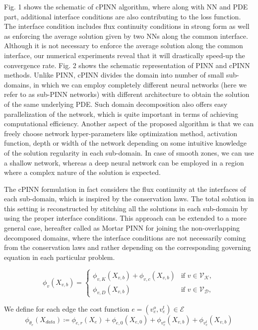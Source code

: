 Fig. 1 shows the schematic of cPINN algorithm, where along with NN and PDE part, additional interface conditions are also contributing to the loss function. The interface condition includes flux continuity conditions in strong form as well as enforcing the average solution given by two NNs along the common interface. Although it is not necessary to enforce the average solution along the common interface, our numerical experiments reveal that it will drastically speed-up the convergence rate. Fig. 2 shows the schematic representation of PINN and cPINN methods. Unlike PINN, cPINN divides the domain into number of small sub-domains, in which we can employ completely different neural networks (here we refer to as sub-PINN networks) with different architecture to obtain the solution of the same underlying PDE. Such domain decomposition also offers easy parallelization of the network, which is quite important in terms of achieving computational efficiency. Another aspect of the proposed algorithm is that we can freely choose network hyper-parameters like optimization method, activation function, depth or width of the network depending on some intuitive knowledge of the solution regularity in each sub-domain. In case of smooth zones, we can use a shallow network, whereas a deep neural network can be employed in a region where a complex nature of the solution is expected.

The cPINN formulation in fact considers the flux continuity at the interfaces of each sub-domain, which is inspired by the conservation laws. The total solution in this setting is reconstructed by stitching all the solutions in each sub-domain by using the proper interface conditions. This approach can be extended to a more general case, hereafter called as Mortar PINN for joining the non-overlapping decomposed domains, where the interface conditions are not necessarily coming from the conservation laws and rather depending on the corresponding governing equation in each particular problem.

\begin{equation}
    \label{vertex funcions}
    \phi_{v}(X_{v,b}) = \begin{cases} \phi_{v,K}  \left( X_{v,b} \right) +  \phi_{v,c}  \left( X_{v,b} \right)& \text{if } v \in \mathcal{V}_{\mathcal{K}}, \\ \phi_{v,D}  \left( X_{v,b} \right) & \text{if } v \in \mathcal{V}_{\mathcal{D}}, \end{cases}
\end{equation}


We define for each edge the cost function $e = (v^{o}_e, v^{t}_e) \in \mathcal{E}$
\begin{equation}
    \label{eq:loss:2}
    \phi_{\theta_e} \left( X_{data} \right) \coloneqq \phi_{e,r}  \left( X_e \right) + \phi_{e,0}  \left( X_{e,0} \right) + \phi_{v^{o}_e}(X_{v,b}) + \phi_{v^{t}_e}(X_{v,b})
\end{equation}